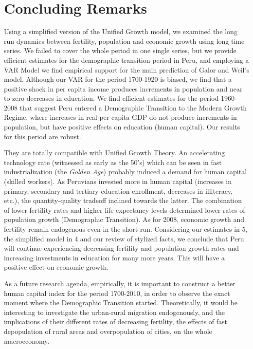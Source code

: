 \documentclass[12pt]{article}%
\begin{document}
\section{Concluding Remarks}
Using a simplified version of the Unified Growth model, we examined the long run dynamics between fertility, population and economic growth using long time series. We failed to cover the whole period in one single series, but we provide efficient estimates for the demographic transition period in Peru, and employing a VAR Model we find empirical support for the main prediction of Galor and Weil's model. Although our VAR for the period 1700-1920 is biased, we find that a positive shock in per capita income produces increments in population and near to zero decreases in education.
We find efficient estimates for the period 1960-2008 that suggest Peru entered a Demographic Transition to the Modern Growth Regime, where increases in real per capita GDP do not produce increments in population, but have positive effects on education (human capital). Our results for this period are robust.

They are totally compatible with Unified Growth Theory. An accelerating technology rate (witnessed as early as the 50's) which can be seen in fast industrialization (the \emph{Golden Age}) probably induced a demand for human capital (skilled workers). As Peruvians invested more in human capital (increases in primary, secondary and tertiary education enrollment, decreases in illiteracy, etc.), the quantity-quality tradeoff inclined towards the latter. The combination of lower fertility rates and higher life expectancy levels determined lower rates of population growth (Demographic Transition). As for 2008, economic growth and fertility remain endogenous even in the short run. Considering our estimates in 5, the simplified model in 4 and our review of stylized facts, we conclude that Peru will continue experiencing decreasing fertility and population growth rates and increasing investments in education for many more years. This will have a positive effect on economic growth.

As a future research agenda, empirically, it is important to construct a better human capital index for the period 1700-2010, in order to observe the exact moment where the Demographic Transition started. Theoretically, it would be interesting to investigate the urban-rural migration endogenously, and the implications of their different rates of decreasing fertility, the effects of fast depopulation of rural areas and overpopulation of cities, on the whole macroeconomy.
\end{document}

